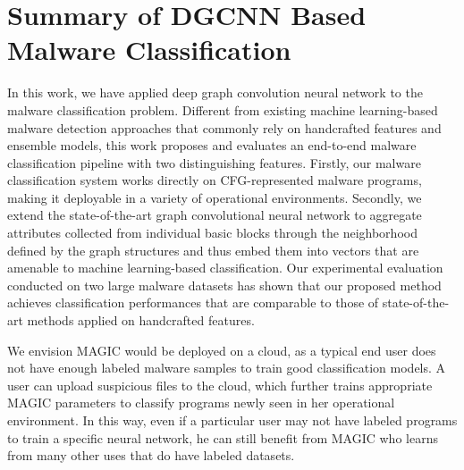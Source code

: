 \section{Summary of DGCNN Based Malware Classification}
\label{MG:Sec:Conclusion}

In this work, we have applied deep graph convolution neural network to the malware classification problem.
Different from existing machine learning-based malware detection approaches that commonly rely on handcrafted features and ensemble models,
this work proposes and evaluates an end-to-end malware classification pipeline with two distinguishing features.
Firstly, our malware classification system works directly on CFG-represented malware programs, making it deployable in a variety of operational environments.
Secondly, we extend the state-of-the-art graph convolutional neural network to aggregate attributes collected from individual basic blocks through the neighborhood defined by the graph structures and thus embed them into vectors that are amenable to machine learning-based classification.
Our experimental evaluation conducted on two large malware datasets has shown that our proposed method achieves classification performances that are comparable to those of state-of-the-art methods applied on handcrafted features.

We envision MAGIC would be deployed on a cloud, as a typical end user does not have enough labeled malware samples to train good classification models.
A user can upload suspicious files to the cloud, which further trains appropriate MAGIC parameters to classify programs newly seen in her operational environment.
In this way, even if a particular user may not have labeled programs to train a specific neural network, he can still benefit from MAGIC who learns from many other uses that do have labeled datasets.



